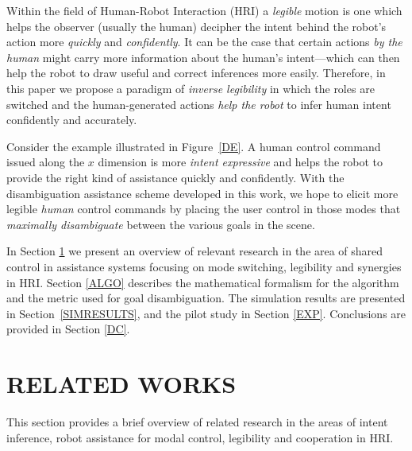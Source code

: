 \documentclass[conference]{IEEEtran}
\begin{document}
Within the field of Human-Robot Interaction (HRI) a \textit{legible} motion is one which helps the observer (usually the human) decipher the intent behind the robot's action more \textit{quickly} and \textit{confidently}. It can be the case that certain actions \textit{by the human} might carry more information about the human's intent---which can then help the robot to draw useful and correct inferences more easily. Therefore, in this paper we propose a paradigm of \textit{inverse legibility} in which the roles are switched and the human-generated actions \textit{help the robot} to infer human intent confidently and accurately. 

Consider the example illustrated in Figure~\ref{DE}. A human control command issued along the $x$ dimension is more \textit{intent expressive} and helps the robot to provide the right kind of assistance quickly and confidently. With the disambiguation assistance scheme developed in this work, we hope to elicit more legible \textit{human} control commands by placing the user control in those modes that \textit{maximally disambiguate} between the various goals in the scene. 


In Section \ref{RW} we present an overview of relevant research in the area of shared control in assistance systems focusing on mode switching, legibility and synergies in HRI. Section \ref{ALGO} describes the mathematical formalism for the algorithm and the metric used for goal disambiguation. The simulation results are presented in Section~\ref{SIMRESULTS}, and the pilot study in Section \ref{EXP}. Conclusions are provided in Section \ref{DC}.

\section{RELATED WORKS}\label{RW} 

This section provides a brief overview of related research in the areas of intent inference, robot assistance for modal control, legibility and cooperation in HRI.
\end{document}

